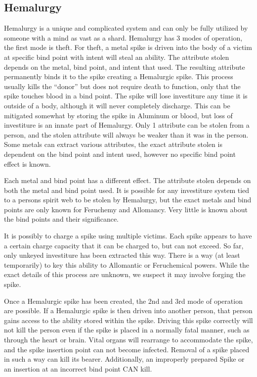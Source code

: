 \documentclass[conference]{IEEEtran}
\begin{document}
\subsection*{\textbf{Hemalurgy}}
Hemalurgy is a unique and complicated system and can only be fully utilized by someone with a mind as vast as a shard.\cite{WoF}  Hemalurgy has 3 modes of operation, the first mode is theft.  For theft, a metal spike is driven into the body of a victim at specific bind point with intent will steal an ability.\cite{WoF}  The attribute stolen depends on the metal,\cite{WoF} bind point,\cite{WoB-holiday} and intent\cite{HE-intent} that used.  The resulting attribute permanently binds it to the spike creating a Hemalurgic spike.\cite{ARS}  This process usually kills the ``donor'' but does not require death to function,\cite{noDeath}\cite{TLM-CH47} only that the spike touches blood in a bind point.  The spike will lose investiture any time it is outside of a body, although it will never completely discharge.\cite{HoA-CH34}\cite{WoF}  This can be mitigated somewhat by storing the spike in Aluminum\cite{anti-decay-Aluminum} or blood,\cite{anti-decay-blood} but loss of investiture is an innate part of Hemalurgy.\cite{WoF}  Only 1 attribute can be stolen from a person,\cite{HE-only1} and the stolen attribute will always be weaker than it was in the person.\cite{HoA-CH34}  Some metals can extract various attributes, the exact attribute stolen is dependent on the bind point\cite{WoB-holiday} and intent\cite{HE-intent} used, however no specific bind point effect is known.

Each metal and bind point has a different effect.  The attribute stolen depends on both the metal and bind point used.\cite{WoF}  It is possible for any investiture system tied to a persons spirit web to be stolen by Hemalurgy, but the exact metals and bind points are only known for Feruchemy and Allomancy.\cite{HE-universal}  Very little is known about the bind points and their significance.

It is possibly to charge a spike using multiple victims.  Each spike appears to have a certain charge capacity that it can be charged to, but can not exceed.  So far, only unkeyed investiture has been extracted this way.  There is a way (at least temporarily) to key this ability to Allomantic or Feruchemical powers.\cite{TLM-CH47}
While the exact details of this process are unknown, we suspect it may involve forging\cite{TES} the spike.

Once a Hemalurgic spike has been created, the 2nd and 3rd mode of operation are possible.  If a Hemalurgic spike is then driven into another person, that person gains access to the ability stored within the spike.\cite{ARS}  Driving this spike correctly will not kill the person even if the spike is placed in a normally fatal manner, such as through the heart or brain.\cite{TFE-CH2}    Vital organs will rearrange to accommodate the spike,\cite{WoF} and the spike insertion point can not become infected.\cite{noInfect}  Removal of a spike placed in such a way can kill its bearer.\cite{HoA-CH42} Additionally, an improperly prepared Spike or an insertion at an incorrect bind point CAN kill. 
\end{document}
